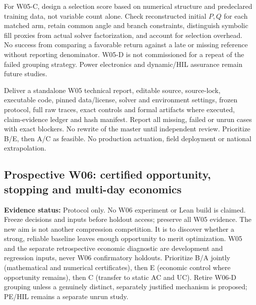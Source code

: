 \documentclass[11pt,letterpaper]{article}
\newcommand{\status}[1]{\textbf{Evidence status:} #1}
\begin{document}
For W05-C, design a selection score based on numerical structure and predeclared training data, not variable count alone. Check reconstructed initial $P,Q$ for each matched arm, retain common angle and branch constraints, distinguish symbolic fill proxies from actual solver factorization, and account for selection overhead. No success from comparing a favorable return against a late or missing reference without reporting denominator. W05-D is not commissioned for a repeat of the failed grouping strategy. Power electronics and dynamic/HIL assurance remain future studies.

Deliver a standalone W05 technical report, editable source, source-lock, executable code, pinned data/license, solver and environment settings, frozen protocol, full raw traces, exact controls and formal artifacts where executed, claim-evidence ledger and hash manifest. Report all missing, failed or unrun cases with exact blockers. No rewrite of the master until independent review. Prioritize B/E, then A/C as feasible. No production actuation, field deployment or national extrapolation.


\subsection{Prospective W06: certified opportunity, stopping and multi-day economics}
\label{sec:w06}
\status{Protocol only. No W06 experiment or Lean build is claimed. Freeze decisions and inputs before holdout access; preserve all W05 evidence.}
The new aim is not another compression competition. It is to discover whether a strong, reliable baseline leaves enough opportunity to merit optimization. W05 and the separate retrospective economic diagnostic are development and regression inputs, never W06 confirmatory holdouts. Prioritize B/A jointly (mathematical and numerical certificates), then E (economic control where opportunity remains), then C (transfer to static AC and UC). Retire W06-D grouping unless a genuinely distinct, separately justified mechanism is proposed; PE/HIL remains a separate unrun study.
\end{document}

